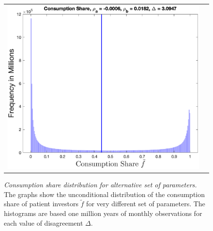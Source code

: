 \begin{figure}[H]
\begin{tabular}{cc}
\includegraphics[width=.4\textwidth]{figures/IAFigCALn6.eps} 
\end{tabular}
\caption{\emph{Consumption share distribution for alternative set of parameters.}  \footnotesize{The graphs show the unconditional distribution of the consumption share of patient investors $\tilde{f}$ for very different set of parameters. The histograms are based one million years of monthly observations for each value of disagreement $\Delta$.}}\label{figIA:rev}
\end{figure}
